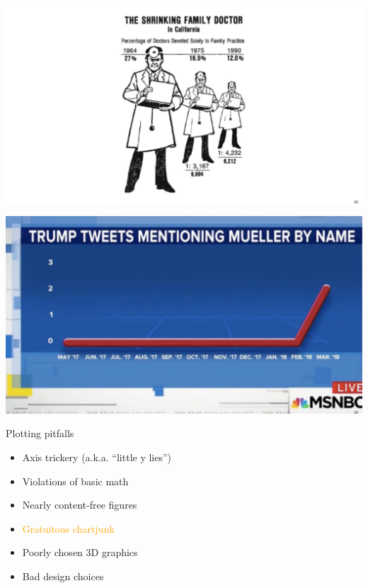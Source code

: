 \documentclass[
  ignorenonframetext,
]{beamer}
\providecommand{\tightlist}{%
  \setlength{\itemsep}{0pt}\setlength{\parskip}{0pt}}
\begin{document}
\begin{frame}{}
\protect\hypertarget{section-14}{}
\includegraphics{hallofshame_figs/fig_22.png}
\end{frame}

\begin{frame}{}
\protect\hypertarget{section-15}{}
\includegraphics{hallofshame_figs/fig_23.png}
\end{frame}

\begin{frame}{Plotting pitfalls}
\protect\hypertarget{plotting-pitfalls-3}{}
\begin{itemize}
\tightlist
\item
  Axis trickery (a.k.a. ``little y lies'')
\item
  Violations of basic math
\item
  Nearly content-free figures
\item
  \textcolor{orange}{Gratuitous chartjunk}
\item
  Poorly chosen 3D graphics
\item
  Bad design choices
\end{itemize}
\end{frame}
\end{document}
